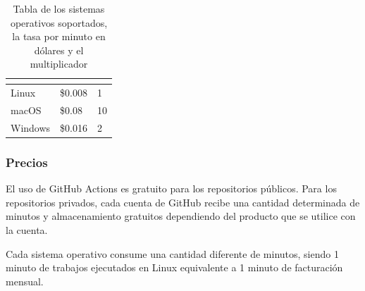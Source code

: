 \documentclass[twoside,twocolumn]{article}
\begin{document}
\begin{table}[ht]
\begin{center}
\begin{tabular}{|l|l|l|}
\hline
\rowcolor[HTML]{6665CD} 
\multicolumn{1}{|c|}{\cellcolor[HTML]{6665CD}{\color[HTML]{FFFFFF} \textbf{Sistema operativo}}} & \multicolumn{1}{c|}{\cellcolor[HTML]{6665CD}{\color[HTML]{FFFFFF} \textbf{Tasa por minuto}}} & \multicolumn{1}{c|}{\cellcolor[HTML]{6665CD}{\color[HTML]{FFFFFF} \textbf{Multiplicador de minutos}}} \\ \hline
Linux                                                                                           & \$0.008                                                                                      & 1                                                                                                     \\ \hline
macOS                                                                                           & \$0.08                                                                                       & 10                                                                                                    \\ \hline
Windows                                                                                         & \$0.016                                                                                      & 2                                                                                                     \\ \hline
\end{tabular}
\end{center}
\caption{Tabla de los sistemas operativos soportados, la tasa por minuto en dólares y el multiplicador}
\end{table}

\subsubsection{Precios}

El uso de GitHub Actions es gratuito para los repositorios públicos. Para los repositorios privados, cada cuenta de GitHub recibe una cantidad determinada de minutos y almacenamiento gratuitos dependiendo del producto que se utilice con la cuenta.


Cada sistema operativo consume una cantidad diferente de minutos, siendo 1 minuto de trabajos ejecutados en Linux equivalente a 1 minuto de facturación mensual.
\end{document}
